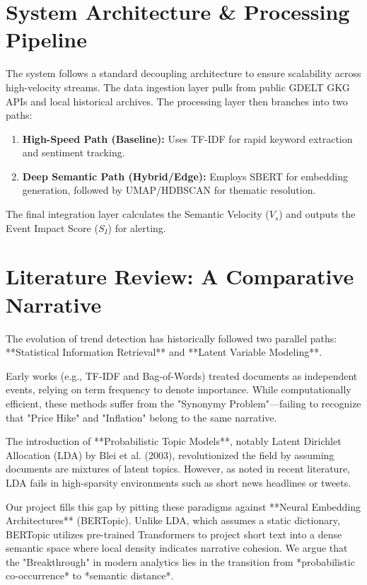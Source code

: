 \documentclass[12pt,a4paper]{article}
\begin{document}
\section{System Architecture \& Processing Pipeline}
The system follows a standard decoupling architecture to ensure scalability across high-velocity streams. The data ingestion layer pulls from public GDELT GKG APIs and local historical archives. The processing layer then branches into two paths:
\begin{enumerate}
    \item \textbf{High-Speed Path (Baseline):} Uses TF-IDF for rapid keyword extraction and sentiment tracking.
    \item \textbf{Deep Semantic Path (Hybrid/Edge):} Employs SBERT for embedding generation, followed by UMAP/HDBSCAN for thematic resolution.
\end{enumerate}
The final integration layer calculates the Semantic Velocity ($V_s$) and outputs the Event Impact Score ($S_I$) for alerting.

\section{Literature Review: A Comparative Narrative}
The evolution of trend detection has historically followed two parallel paths: **Statistical Information Retrieval** and **Latent Variable Modeling**.

Early works (e.g., TF-IDF and Bag-of-Words) treated documents as independent events, relying on term frequency to denote importance. While computationally efficient, these methods suffer from the "Synonymy Problem"—failing to recognize that "Price Hike" and "Inflation" belong to the same narrative.

The introduction of **Probabilistic Topic Models**, notably Latent Dirichlet Allocation (LDA) by Blei et al. (2003), revolutionized the field by assuming documents are mixtures of latent topics. However, as noted in recent literature, LDA fails in high-sparsity environments such as short news headlines or tweets.

Our project fills this gap by pitting these paradigms against **Neural Embedding Architectures** (BERTopic). Unlike LDA, which assumes a static dictionary, BERTopic utilizes pre-trained Transformers to project short text into a dense semantic space where local density indicates narrative cohesion. We argue that the "Breakthrough" in modern analytics lies in the transition from *probabilistic co-occurrence* to *semantic distance*.
\end{document}
